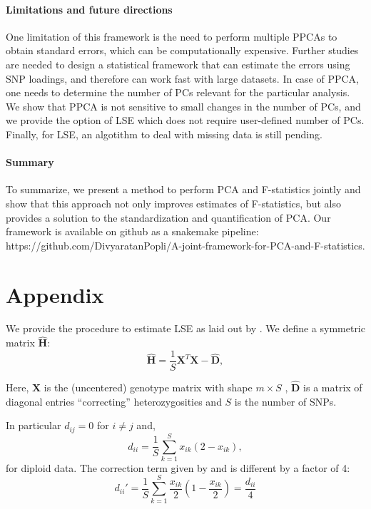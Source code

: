\documentclass[12pt, letterpaper]{article}
\newcommand{\MX}{\mathbf{X}}
\begin{document}
\paragraph{Limitations and future directions}
One limitation of this framework is the need to perform multiple PPCAs to obtain standard errors, which can be computationally expensive. Further studies are needed to design a statistical framework that can estimate the errors using SNP loadings, and therefore can work fast with large datasets. In case of PPCA, one needs to determine the number of PCs relevant for the particular analysis. We show that PPCA is not sensitive to small changes in the number of PCs, and we provide the option of LSE which does not require user-defined number of PCs. Finally, for LSE, an algotithm to deal with missing data is still pending. 

\paragraph{Summary}
To summarize, we present a method to perform PCA and F-statistics jointly and show that this approach not only improves estimates of F-statistics, but also provides a solution to the standardization and quantification of PCA. Our framework is available on github as a snakemake pipeline: https://github.com/DivyaratanPopli/A-joint-framework-for-PCA-and-F-statistics.


\section{Appendix}

We provide the procedure to estimate LSE as laid out by \cite{cabreros_likelihood-free_2019}. We define a symmetric matrix $\hat{\mathbf{H}}$:
\begin{equation}
    \hat{\mathbf{H}} = \frac{1}{S}\mathbf{X}^T\mathbf{X} - \hat{\mathbf{D}},
\end{equation}

Here, $\MX$ is the (uncentered) genotype matrix with shape $m \times S$ , $\hat{\mathbf{D}}$ is a matrix of diagonal entries ``correcting'' heterozygosities and $S$ is the number of SNPs.

In particular $d_{ij} = 0 $ for $i \neq j$ and, 
\begin{equation}
    d_{ii} = \frac{1}{S}\sum_{k=1}^S x_{ik}(2-x_{ik}),
\end{equation}
for diploid data. The correction term given by \cite{reich_reconstructing_2009} and \cite{patterson_ancient_2012} is different by a factor of 4:
\begin{equation*}
    d_{ii}' = \frac{1}{S}\sum_{k=1}^S \frac{x_{ik}}{2}(1-\frac{x_{ik}}{2}) = \frac{d_{ii}}{4}
\end{equation*}
\end{document}
